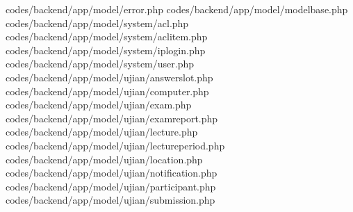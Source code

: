 codes/backend/app/model/error.php
codes/backend/app/model/modelbase.php
codes/backend/app/model/system/acl.php
codes/backend/app/model/system/aclitem.php
codes/backend/app/model/system/iplogin.php
codes/backend/app/model/system/user.php
codes/backend/app/model/ujian/answerslot.php
codes/backend/app/model/ujian/computer.php
codes/backend/app/model/ujian/exam.php
codes/backend/app/model/ujian/examreport.php
codes/backend/app/model/ujian/lecture.php
codes/backend/app/model/ujian/lectureperiod.php
codes/backend/app/model/ujian/location.php
codes/backend/app/model/ujian/notification.php
codes/backend/app/model/ujian/participant.php
codes/backend/app/model/ujian/submission.php
